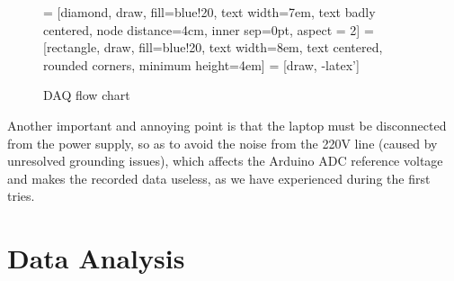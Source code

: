 \documentclass[12pt]{article}
\begin{document}
\begin{figure}[H]
\centering
 = [diamond, draw, fill=blue!20, 
    text width=7em, text badly centered, node distance=4cm, inner sep=0pt, aspect = 2]
 = [rectangle, draw, fill=blue!20, 
    text width=8em, text centered, rounded corners, minimum height=4em]
 = [draw, -latex']
\caption{DAQ flow chart}
\end{figure}
Another important and annoying point is that the laptop must be disconnected from the power supply, so as to avoid the noise from the 220V line (caused by unresolved grounding issues), which affects the Arduino ADC reference voltage and makes the recorded data useless, as we have experienced during the first tries. 
\section{Data Analysis}
\end{document}
